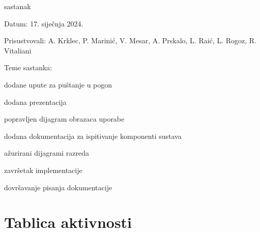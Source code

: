 \begin{packed_enum}
	\item  sastanak
	\item[] \begin{packed_item}
		\item Datum: 17. siječnja 2024.
		\item Prisustvovali: A. Krklec, P. Marinić, V. Mesar, A. Prskalo, L. Raić, L. Rogoz, R. Vitaliani
		\item Teme sastanka:
		\begin{packed_item}
			\item dodane upute za puštanje u pogon
			\item dodana prezentacija
			\item popravljen dijagram obrazaca uporabe
			\item dodana dokumentacija za ispitivanje komponenti sustava
			\item ažurirani dijagrami razreda
			\item završetak implementacije
			\item dovršavanje pisanja dokumentacije
		\end{packed_item}
	\end{packed_item}


\end{packed_enum}

\eject
\section*{Tablica aktivnosti}

